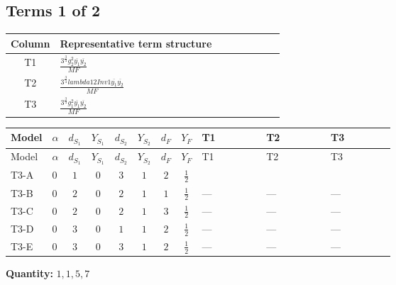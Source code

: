 \documentclass[8pt]{article}
\begin{document}
\begin{landscape}
\subsection*{Terms 1 of 2}
\begin{center}
\begin{tabular}{@{}c >{\raggedright\arraybackslash}p{0.82\linewidth}@{}}
\toprule
Column & Representative term structure \\
\midrule
T1 & \(\displaystyle \frac{3^{\frac{3}{4}} g_{2}^{2} \overline{y_{1}} \overline{y_{2}}}{MF}\) \\
\midrule
T2 & \(\displaystyle \frac{3^{\frac{3}{4}} lambda12Inv1 \overline{y_{1}} \overline{y_{2}}}{MF}\) \\
\midrule
T3 & \(\displaystyle \frac{3^{\frac{3}{4}} g_{1}^{2} \overline{y_{1}} \overline{y_{2}}}{MF}\) \\
\midrule
\bottomrule
\end{tabular}
\end{center}
\smallskip
\tiny
\begin{longtable}{@{}llcccccc >{\raggedright\arraybackslash}p{0.21\linewidth} >{\raggedright\arraybackslash}p{0.21\linewidth} >{\raggedright\arraybackslash}p{0.21\linewidth}@{}}
\toprule
Model & $\alpha$ & $d_{S_1}$ & $Y_{S_1}$ & $d_{S_2}$ & $Y_{S_2}$ & $d_F$ & $Y_F$ & T1 & T2 & T3 \\
\midrule
\endfirsthead
\toprule
Model & $\alpha$ & $d_{S_1}$ & $Y_{S_1}$ & $d_{S_2}$ & $Y_{S_2}$ & $d_F$ & $Y_F$ & T1 & T2 & T3 \\
\midrule
\endhead
T3-A & $0$ & $1$ & $0$ & $3$ & $1$ & $2$ & $\frac{1}{2}$ & \scriptsize\adjustbox{max width=\linewidth}{$\begin{gathered} - \frac{11 \cdot 3^{\frac{3}{4}} g_{2}^{2} \overline{y_{1}} \overline{y_{2}}}{8 MF}\end{gathered}$} & \scriptsize\adjustbox{max width=\linewidth}{$\begin{gathered} - \frac{3^{\frac{3}{4}} lambda12Inv1 \overline{y_{1}} \overline{y_{2}}}{6 MF}\end{gathered}$} & \scriptsize\adjustbox{max width=\linewidth}{$\begin{gathered} - \frac{3^{\frac{3}{4}} g_{1}^{2} \overline{y_{1}} \overline{y_{2}}}{8 MF}\end{gathered}$} \\
\midrule
T3-B & $0$ & $2$ & $0$ & $2$ & $1$ & $1$ & $\frac{1}{2}$ & --- & --- & --- \\
\midrule
T3-C & $0$ & $2$ & $0$ & $2$ & $1$ & $3$ & $\frac{1}{2}$ & --- & --- & --- \\
\midrule
T3-D & $0$ & $3$ & $0$ & $1$ & $1$ & $2$ & $\frac{1}{2}$ & --- & --- & --- \\
\midrule
T3-E & $0$ & $3$ & $0$ & $3$ & $1$ & $2$ & $\frac{1}{2}$ & --- & --- & --- \\
\midrule
\bottomrule
\end{longtable}
\clearpage
\noindent\textbf{Quantity: }$\mathrm{1,1,5,7}$\par\smallskip

\end{landscape}
\end{document}
